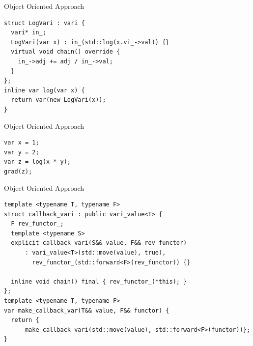 \documentclass[dvipsnames]{beamer}
\newenvironment{CacheLine}[1][]{
  \begin{tikzpicture}[x=1.2cm,y=0.8cm,font=\footnotesize,>=Stealth,#1]
    \def\CacheH{1.0}   %
    \def\CacheBelow{1.0} %

}{
    \foreach \i in {1,...,7} { \draw[black!40] (\i,0) -- (\i,\CacheH); }
    \draw[line width=0.6pt, rounded corners=2pt] (0,0) rectangle (8,\CacheH);
    \foreach \i in {0,...,7} {
      \node[below=3pt, text=black!75] at (\i+0.5,0) {8B \i};
    }
  \end{tikzpicture}
}
\newcommand{\CacheColor}[2]{%
  \fill[#2, fill opacity=0.35, draw=none] (#1,0) rectangle ++(1,\CacheH);%
}
\newcommand{\CacheMarkBelow}[3][green!60!black]{%
  \draw[-{Stealth[length=3mm]}, very thick, draw=#1] (#2,-\CacheBelow+0.28) -- (#2,0.02);
  \node[below, text=#1] at (#2,-\CacheBelow+0.28) {#3};
}
\newcommand{\CacheSetBelow}[1]{\def\CacheBelow{#1}}
\begin{document}

\begin{frame}[fragile]{Object Oriented Approach}
\begin{verbatim}
struct LogVari : vari {
  vari* in_;
  LogVari(var x) : in_(std::log(x.vi_->val)) {}
  virtual void chain() override {
    in_->adj += adj / in_->val;
  }
};
inline var log(var x) {
  return var(new LogVari(x));
}
\end{verbatim}
\end{frame}

\begin{frame}[fragile]{Object Oriented Approach}
\begin{verbatim}
var x = 1;
var y = 2;
var z = log(x * y);
grad(z);
\end{verbatim}
\end{frame}

\begin{frame}[fragile]{Object Oriented Approach}
\begin{verbatim}
template <typename T, typename F>
struct callback_vari : public vari_value<T> {
  F rev_functor_;
  template <typename S>
  explicit callback_vari(S&& value, F&& rev_functor)
      : vari_value<T>(std::move(value), true),
        rev_functor_(std::forward<F>(rev_functor)) {}

  inline void chain() final { rev_functor_(*this); }
};
template <typename T, typename F>
var make_callback_var(T&& value, F&& functor) {
  return {
      make_callback_vari(std::move(value), std::forward<F>(functor))};
}

\end{verbatim}
\end{frame}
\end{document}
